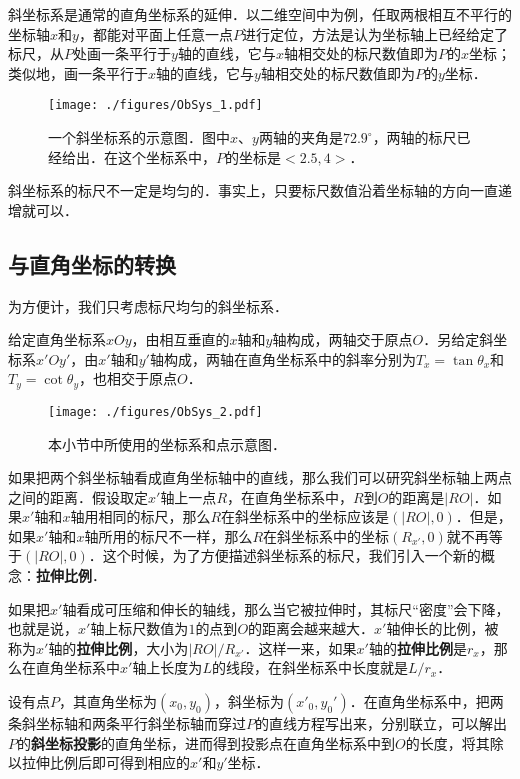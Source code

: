 

斜坐标系是通常的直角坐标系的延伸．以二维空间中为例，任取两根相互不平行的坐标轴$x$和$y$，都能对平面上任意一点$P$进行定位，方法是认为坐标轴上已经给定了标尺，从$P$处画一条平行于$y$轴的直线，它与$x$轴相交处的标尺数值即为$P$的$x$坐标；类似地，画一条平行于$x$轴的直线，它与$y$轴相交处的标尺数值即为$P$的$y$坐标．

\begin{figure}[ht]
\centering
\texttt{[image: ./figures/ObSys\_1.pdf]}
\caption{一个斜坐标系的示意图．图中$x$、$y$两轴的夹角是$72.9^\circ$，两轴的标尺已经给出．在这个坐标系中，$P$的坐标是$<2.5, 4>$．} \label{ObSys_fig1}
\end{figure}

斜坐标系的标尺不一定是均匀的．事实上，只要标尺数值沿着坐标轴的方向一直递增就可以．

\subsection{与直角坐标的转换}

为方便计，我们只考虑标尺均匀的斜坐标系．

给定直角坐标系$xOy$，由相互垂直的$x$轴和$y$轴构成，两轴交于原点$O$．另给定斜坐标系$x'Oy'$，由$x'$轴和$y'$轴构成，两轴在直角坐标系中的斜率分别为$T_x=\tan{\theta_x}$和$T_y=\cot{\theta_y}$，也相交于原点$O$．

\begin{figure}[ht]
\centering
\texttt{[image: ./figures/ObSys\_2.pdf]}
\caption{本小节中所使用的坐标系和点示意图．} \label{ObSys_fig2}
\end{figure}

如果把两个斜坐标轴看成直角坐标轴中的直线，那么我们可以研究斜坐标轴上两点之间的距离．假设取定$x'$轴上一点$R$，在直角坐标系中，$R$到$O$的距离是$|RO|$．如果$x'$轴和$x$轴用相同的标尺，那么$R$在斜坐标系中的坐标应该是$(|RO|, 0)$．但是，如果$x'$轴和$x$轴所用的标尺不一样，那么$R$在斜坐标系中的坐标$(R_{x'},0)$就不再等于$(|RO|, 0)$．这个时候，为了方便描述斜坐标系的标尺，我们引入一个新的概念：\textbf{拉伸比例}．

如果把$x'$轴看成可压缩和伸长的轴线，那么当它被拉伸时，其标尺“密度”会下降，也就是说，$x'$轴上标尺数值为$1$的点到$O$的距离会越来越大．$x'$轴伸长的比例，被称为$x'$轴的\textbf{拉伸比例}，大小为$|RO|/R_{x'}$．这样一来，如果$x'$轴的\textbf{拉伸比例}是$r_x$，那么在直角坐标系中$x'$轴上长度为$L$的线段，在斜坐标系中长度就是$L/r_x$．

设有点$P$，其直角坐标为$(x_0, y_0)$，斜坐标为$(x'_0, y_0')$．在直角坐标系中，把两条斜坐标轴和两条平行斜坐标轴而穿过$P$的直线方程写出来，分别联立，可以解出$P$的\textbf{斜坐标投影}的直角坐标，进而得到投影点在直角坐标系中到$O$的长度，将其除以拉伸比例后即可得到相应的$x'$和$y'$坐标．





